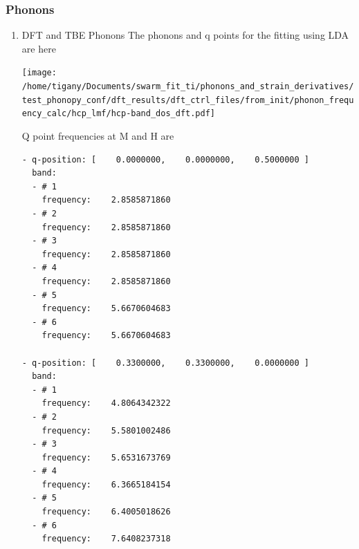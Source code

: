 \documentclass[11pt]{article}
\begin{document}
\subsubsection{Phonons}
\label{sec:orgc2c87bb}

\begin{enumerate}
\item DFT and TBE Phonons
\label{sec:org1c025c0}
The phonons and q points for the fitting using LDA are here
\begin{center}
\texttt{[image: /home/tigany/Documents/swarm\_fit\_ti/phonons\_and\_strain\_derivatives/test\_phonopy\_conf/dft\_results/dft\_ctrl\_files/from\_init/phonon\_frequency\_calc/hcp\_lmf/hcp-band\_dos\_dft.pdf]}
\end{center}
Q point frequencies at M and H are 
\begin{verbatim}
- q-position: [    0.0000000,    0.0000000,    0.5000000 ]
  band:
  - # 1
    frequency:    2.8585871860
  - # 2
    frequency:    2.8585871860
  - # 3
    frequency:    2.8585871860
  - # 4
    frequency:    2.8585871860
  - # 5
    frequency:    5.6670604683
  - # 6
    frequency:    5.6670604683

- q-position: [    0.3300000,    0.3300000,    0.0000000 ]
  band:
  - # 1
    frequency:    4.8064342322
  - # 2
    frequency:    5.5801002486
  - # 3
    frequency:    5.6531673769
  - # 4
    frequency:    6.3665184154
  - # 5
    frequency:    6.4005018626
  - # 6
    frequency:    7.6408237318

\end{verbatim}
\end{enumerate}
\end{document}
